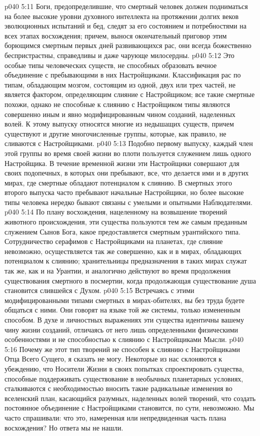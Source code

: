 \vs p040 5:11 \pc Боги, предопределившие, что смертный человек должен подниматься на более высокие уровни духовного интеллекта на протяжении долгих веков эволюционных испытаний и бед, следят за его состоянием и потребностями на всех этапах восхождения; причем, вынося окончательный приговор этим борющимся смертным первых дней развивающихся рас, они всегда божественно беспристрастны, справедливы и даже чарующе милосердны.
\vs p040 5:12 \pc {} Это особые типы человеческих существ, не способных образовать вечное объединение с пребывающими в них Настройщиками. Классификация рас по типам, обладающим мозгом, состоящим из одной, двух или трех частей, не является фактором, определяющим слияние с Настройщиком; все такие смертные похожи, однако не способные к слиянию с Настройщиком типы являются совершенно иным и явно модифицированным чином созданий, наделенных волей. К этому выпуску относятся многие из недышащих существ, причем существуют и другие многочисленные группы, которые, как правило, не сливаются с Настройщиками.
\vs p040 5:13 Подобно первому выпуску, каждый член этой группы во время своей жизни во плоти пользуется служением лишь одного Настройщика. В течение временной жизни эти Настройщики совершают для своих подопечных, в которых они пребывают, все, что делается ими и в других мирах, где смертные обладают потенциалом к слиянию. В смертных этого второго выпуска часто пребывают начальные Настройщики, но более высокие типы человека нередко бывают связаны с умелыми и опытными Наблюдателями.
\vs p040 5:14 По плану восхождения, нацеленному на возвышение творений животного происхождения, эти существа пользуются тем же самым преданным служением Сынов Бога, какое предоставляется смертным урантийского типа. Сотрудничество серафимов с Настройщиками на планетах, где слияние невозможно, осуществляется так же совершенно, как и в мирах, обладающих потенциалом к слиянию; хранительницы предназначения в таких мирах служат так же, как и на Урантии, и аналогично действуют во время продолжения существования смертного в посмертии, когда продолжающая существование душа становится слившейся с Духом.
\vs p040 5:15 Встречаясь с этими модифицированными типами смертных в мирах\hyp{}обителях, вы без труда будете общаться с ними. Они говорят на языке той же системы, только измененным способом. В духе и личностных выражениях эти существа идентичны вашему чину жизни созданий, отличаясь от него лишь определенными физическими особенностями и не способностью к слиянию с Настройщиками Мысли.
\vs p040 5:16 Почему же этот тип творений не способен к слиянию с Настройщиками Отца Всего Сущего, я сказать не могу. Некоторые из нас склоняются к убеждению, что Носители Жизни в своих попытках спроектировать существа, способные поддерживать существование в необычных планетарных условиях, сталкиваются с необходимостью вносить такие радикальные изменения во вселенский план, касающийся разумных, наделенных волей творений, что создать постоянное объединение с Настройщиками становится, по сути, невозможно. Мы часто спрашивали: что это, намеренная или непредвиденная часть плана восхождения? Но ответа мы не нашли.
